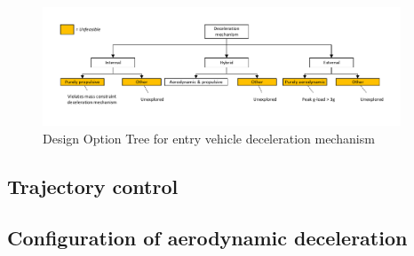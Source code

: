 \begin{figure}[H]
\centering
\includegraphics[width = 0.95\textwidth]{Figure/DOT_decelerationmechanism.pdf}
\caption{Design Option Tree for entry vehicle deceleration mechanism}
\label{fig:dotdelmech}
\end{figure}

\subsection{Trajectory control}

\subsection{Configuration of aerodynamic deceleration}



